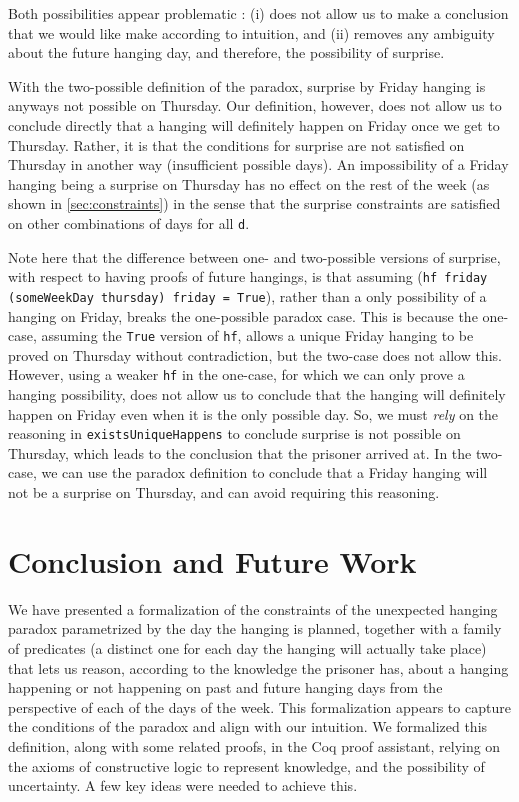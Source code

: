 \documentclass[runningheads]{llncs}
\begin{document}
Both possibilities appear problematic : (i) does not allow us to make
a conclusion that we would like make according to intuition,
and (ii) removes any ambiguity
about the future hanging day, and therefore, the possibility of surprise.

With the two-possible definition of the paradox, surprise by Friday hanging is anyways
not possible on Thursday.
Our definition, however, does not allow us to conclude directly that a hanging will
definitely happen on Friday once we get to Thursday. Rather, it is that the
conditions for surprise are not satisfied on Thursday in another way (insufficient
possible days). An impossibility of a Friday hanging being a surprise on Thursday has no effect
on the rest of the week (as shown in \ref{sec:constraints}) in the sense that
the surprise constraints are satisfied on other combinations of days for all {\tt d}.

Note here that
the difference between one- and two-possible versions of surprise, with respect
to having proofs of future hangings, is that assuming
({\tt hf friday (someWeekDay thursday) friday = True}), rather than a only
possibility of a hanging on Friday, breaks the one-possible paradox case.
This is because the one-case, assuming the {\tt True} version of {\tt hf},
allows a unique Friday hanging to be proved on Thursday without contradiction, but
the two-case does not allow this. However, using a weaker {\tt hf} in the one-case, for which
we can only prove a hanging possibility, does not allow us to conclude that
the hanging will definitely happen on Friday even when it is the only possible day.
So, we must \emph{rely} on the reasoning in
{\tt existsUniqueHappens} to conclude surprise is not possible on Thursday,
which leads to the conclusion that the prisoner arrived at.
In the two-case, we can use the paradox definition to conclude that a Friday
hanging will not be a surprise on Thursday, and can avoid requiring this reasoning.

\section{Conclusion and Future Work}

We have presented a formalization of the constraints of the unexpected hanging paradox
parametrized by the day the hanging is planned,
together with a family of predicates (a distinct one for each day the hanging
will actually take place) that lets us reason, according to the knowledge the prisoner has,
about a hanging happening or not happening on
past and future hanging days from the perspective of each of the days of the week.
This formalization appears to capture the
conditions of the paradox and align with our intuition.
We formalized this definition, along with some related proofs, in the Coq
proof assistant, relying on the axioms of constructive logic to represent knowledge,
and the possibility of uncertainty.
A few key ideas were needed to achieve this.
\end{document}
